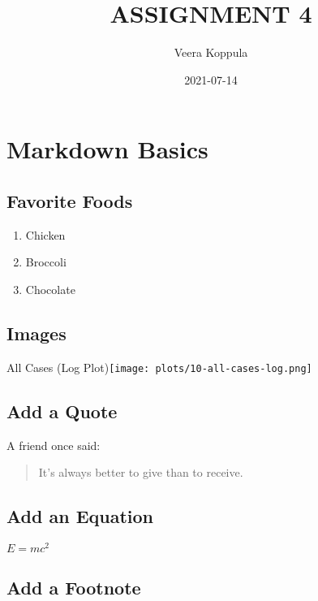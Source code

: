 \documentclass[
]{article}
\title{ASSIGNMENT 4}
\author{Veera Koppula}
\date{2021-07-14}
\providecommand{\tightlist}{%
  \setlength{\itemsep}{0pt}\setlength{\parskip}{0pt}}
\begin{document}
\maketitle

\hypertarget{markdown-basics}{%
\section{Markdown Basics}\label{markdown-basics}}

\hypertarget{favorite-foods}{%
\subsection{Favorite Foods}\label{favorite-foods}}

\begin{enumerate}
\def\labelenumi{\arabic{enumi}.}
\tightlist
\item
  Chicken
\item
  Broccoli
\item
  Chocolate
\end{enumerate}

\hypertarget{images}{%
\subsection{Images}\label{images}}

All Cases (Log Plot)\texttt{[image: plots/10-all-cases-log.png]}

\hypertarget{add-a-quote}{%
\subsection{Add a Quote}\label{add-a-quote}}

A friend once said:

\begin{quote}
It's always better to give than to receive.
\end{quote}

\hypertarget{add-an-equation}{%
\subsection{Add an Equation}\label{add-an-equation}}

\(E = mc^2\)

\hypertarget{add-a-footnote}{%
\subsection{Add a Footnote}\label{add-a-footnote}}
\end{document}
